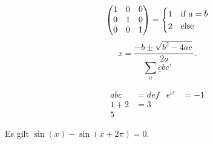 \documentclass{article}
\begin{document}
\[
  \begin{pmatrix}
    1 & 0 & 0 \\
    0 & 1 & 0 \\
    0 & 0 & 1
  \end{pmatrix}
  =
  \begin{cases}
    1 & $if $a=b\\
    2 & $else$
  \end{cases}
\]
\ShowMathMLObj
\[
  x = \frac{-b \pm \sqrt{b^2-4ac}}{2a}.
\]
\[
  \sum_a\underline c\dot bc'
\]

\begin{align}
  abc&=def & e^{\mathrm{i}\pi}&=-1\\
  1+2&=3\\
  5
\end{align}

Es gilt $\sin(x)-\sin(x+2\pi)=0$.
\end{document}
